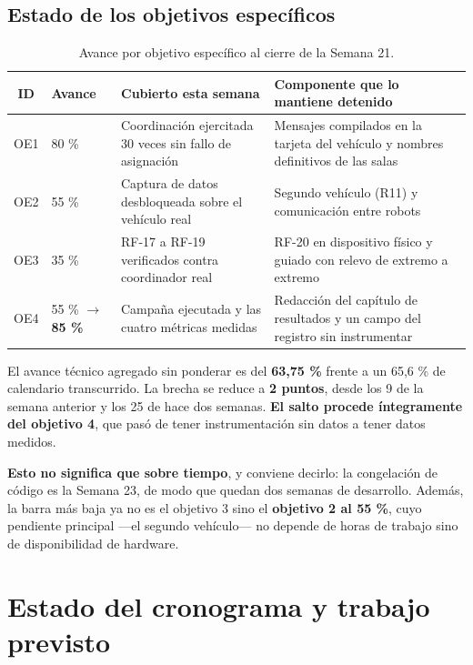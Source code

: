 \documentclass[12pt,letterpaper]{article}
\begin{document}
\subsection{Estado de los objetivos específicos}

\begin{table}[H]
    \centering
    \small
    \caption{Avance por objetivo específico al cierre de la Semana 21.}
    \label{tab:objetivos}
    \begin{tabular}{@{}cp{2.6cm}p{4.2cm}p{4.8cm}@{}}
        \toprule
        \textbf{ID} & \textbf{Avance} & \textbf{Cubierto esta semana} & \textbf{Componente que lo mantiene detenido} \\ \midrule
        OE1 & 80 \% & Coordinación ejercitada 30 veces sin fallo de asignación & Mensajes compilados en la tarjeta del vehículo y nombres definitivos de las salas \\ \addlinespace
        OE2 & 55 \% & Captura de datos desbloqueada sobre el vehículo real & Segundo vehículo (R11) y comunicación entre robots \\ \addlinespace
        OE3 & 35 \% & RF-17 a RF-19 verificados contra coordinador real & RF-20 en dispositivo físico y guiado con relevo de extremo a extremo \\ \addlinespace
        OE4 & 55 \% $\rightarrow$ \textbf{85 \%} & Campaña ejecutada y las cuatro métricas medidas & Redacción del capítulo de resultados y un campo del registro sin instrumentar \\ \bottomrule
    \end{tabular}
\end{table}

El avance técnico agregado sin ponderar es del \textbf{63,75 \%} frente a un 65,6 \% de calendario transcurrido. La brecha se reduce a \textbf{2 puntos}, desde los 9 de la semana anterior y los 25 de hace dos semanas. \textbf{El salto procede íntegramente del objetivo 4}, que pasó de tener instrumentación sin datos a tener datos medidos.

\textbf{Esto no significa que sobre tiempo}, y conviene decirlo: la congelación de código es la Semana 23, de modo que quedan dos semanas de desarrollo. Además, la barra más baja ya no es el objetivo 3 sino el \textbf{objetivo 2 al 55 \%}, cuyo pendiente principal ---el segundo vehículo--- no depende de horas de trabajo sino de disponibilidad de hardware.

\section{Estado del cronograma y trabajo previsto}
\label{sec:cronograma}
\end{document}
